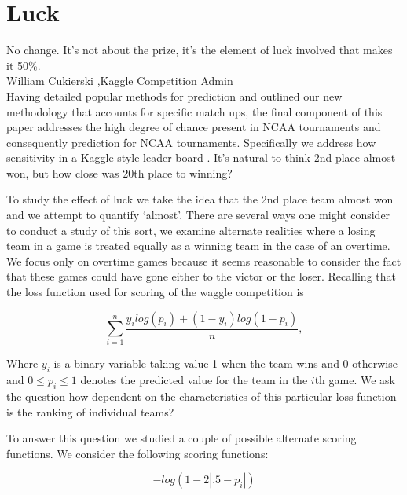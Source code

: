 
\section{Luck}
\noindent No change. It's not about the prize, it's the element of luck involved that makes it 50\%.\\
\noindent  William Cukierski ,Kaggle Competition Admin \\

Having detailed popular methods for prediction and outlined our new methodology that accounts for specific match ups, the final component of this paper addresses the high degree of chance present in NCAA tournaments and consequently prediction for NCAA tournaments.  Specifically we address how sensitivity in a Kaggle style leader board . It's natural to think 2nd place almost won, but how close was 20th place to winning? 


To study the effect of luck we take the idea that the 2nd place team almost won and we attempt to quantify `almost'. There are several ways one might consider to conduct a study of this sort, we examine alternate realities where a losing team in a game is treated equally as a winning team in the case of an overtime. We focus only on overtime games because it seems reasonable to consider the fact that these games could have gone either to the victor or the loser. Recalling that the loss function used for scoring of the waggle competition is

\begin{equation}
\sum_{i=1}^n\frac{y_ilog(p_i)+ (1-y_i)log(1-p_i)}{n},
\end{equation}

Where $y_i$ is a binary variable taking value 1 when the team wins and 0 otherwise and $0 \leq p_i \leq 1$ denotes the predicted value for the team in the $i$th game.  
We ask the question how dependent on the characteristics of this particular loss function is the ranking of individual teams? 

To answer this question we studied a couple of possible alternate scoring functions. We consider the following scoring functions: 
 
\begin{equation}\label{eqn:first_score_function}
-log(1-2|.5-p_i|)
\end{equation} 

